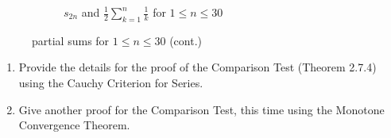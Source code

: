 \documentclass{lew98_solutions}
\begin{document}
\begin{solution}
\begin{figure}[H]
\begin{subfigure}{0.85\textwidth}
            \caption{\( s_{2n} \) and \( \tfrac{1}{2} \sum_{k=1}^n \frac{1}{k} \) for \( 1 \leq n \leq 30 \)}
        \end{subfigure}
        \caption{ partial sums for \( 1 \leq n \leq 30 \) (cont.)}
        \label{fig:ex2.7.2}
    \end{figure}
\end{solution}

\begin{exercise}
\label{ex:2.7.3}
    \begin{enumerate}
        \item Provide the details for the proof of the Comparison Test (Theorem 2.7.4) using the Cauchy Criterion for Series.

        \item Give another proof for the Comparison Test, this time using the Monotone Convergence Theorem.
    \end{enumerate}
\end{exercise}
\end{document}
